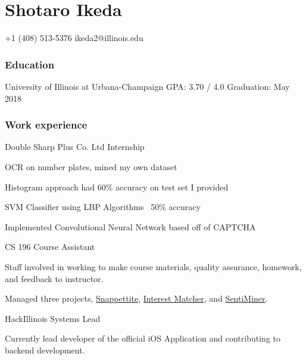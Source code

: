 \documentclass{tccv}
\newenvironment{itemize*}%
{\begin{itemize}%
    \vspace{-0.7em}
    \setlength{\itemsep}{0pt}%
    \setlength{\parskip}{0pt}}%
  {\end{itemize}}
\begin{document}
\part{Shotaro Ikeda}

{+1 (408) 513-5376}
{ikeda2@illinois.edu}

\section{Education}

\begin{yearlist}

  {University of Illinois at  \newline Urbana-Champaign}
  {GPA: 3.70 / 4.0}
  {Graduation: May 2018}

\end{yearlist}

\section{Work experience}

\begin{eventlist}
  {Double Sharp Plus Co. Ltd}
  {Internship}

  \begin{itemize*}
  \item OCR on number plates, mined my own dataset
  \item Histogram approach had 60\% accuracy on test set I provided
  \item SVM Classifier using LBP Algorithms ~50\% accuracy
  \item Implemented Convolutional Neural Network based off of CAPTCHA
  \end{itemize*}

  {CS 196}
  {Course Assistant}

  \begin{itemize*}
  \item Staff involved in working to make course materials, quality assurance, homework, and feedback to instructor.
  \item Managed three projects, \href{https://github.com/SNAPPETITE}{Snappettite}, \href{https://github.com/InterestMatcher}{Interest Matcher}, and \href{https://github.com/GlobusTroy/SentiMiner}{SentiMiner}.
  \end{itemize*}

  {HackIllinois}
  {Systems Lead}
  \begin{itemize*}
  \item Currently lead developer of the official iOS Application and contributing to \\
    backend development.
  \end{itemize*}

\end{eventlist}
\end{document}
